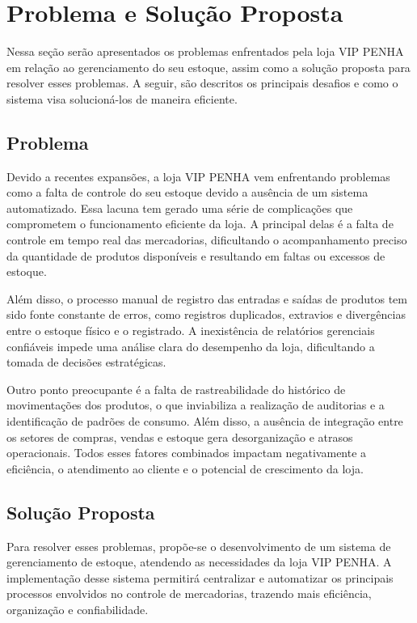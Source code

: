 \documentclass[
	12pt,				%
	openany,			%
	twoside,			%
	a4paper,			%
	english,			%
	brazil				%
	]{abntex2}
\begin{document}
\section{Problema e Solução Proposta}

Nessa seção serão apresentados os problemas enfrentados pela loja VIP PENHA em relação ao gerenciamento do seu estoque, assim como a solução proposta para resolver esses problemas. A seguir, são descritos os principais desafios e como o sistema visa solucioná-los de maneira eficiente.

\subsection{Problema}

Devido a recentes expansões, a loja VIP PENHA vem enfrentando problemas como a falta de controle do seu estoque devido a ausência de um sistema automatizado. Essa lacuna tem gerado uma série de complicações que comprometem o funcionamento eficiente da loja. A principal delas é a falta de controle em tempo real das mercadorias, dificultando o acompanhamento preciso da quantidade de produtos disponíveis e resultando em faltas ou excessos de estoque.

Além disso, o processo manual de registro das entradas e saídas de produtos tem sido fonte constante de erros, como registros duplicados, extravios e divergências entre o estoque físico e o registrado. A inexistência de relatórios gerenciais confiáveis impede uma análise clara do desempenho da loja, dificultando a tomada de decisões estratégicas.

Outro ponto preocupante é a falta de rastreabilidade do histórico de movimentações dos produtos, o que inviabiliza a realização de auditorias e a identificação de padrões de consumo. Além disso, a ausência de integração entre os setores de compras, vendas e estoque gera desorganização e atrasos operacionais. Todos esses fatores combinados impactam negativamente a eficiência, o atendimento ao cliente e o potencial de crescimento da loja.


\subsection{Solução Proposta}

Para resolver esses problemas, propõe-se o desenvolvimento de um sistema de gerenciamento de estoque, atendendo as necessidades da loja VIP PENHA. A implementação desse sistema permitirá centralizar e automatizar os principais processos envolvidos no controle de mercadorias, trazendo mais eficiência, organização e confiabilidade.
\end{document}
